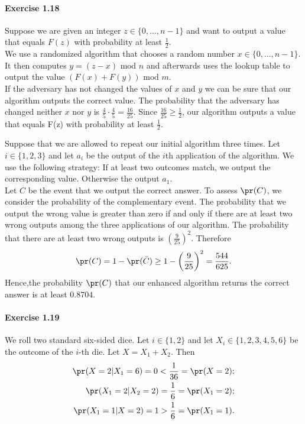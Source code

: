 \paragraph{Exercise 1.18} Suppose we are given an integer $z \in \{ 0, ..., n-1 \}$
and want to output a value that equals $F(z)$ with probability at least
$\frac{1}{2}$. \\
We use a randomized algorithm that chooses a random number $x \in \{ 0, ..., n-1 \}$.
It then computes $y = (z - x) \text{ mod }n$ and afterwards uses the lookup table
to output the value $(F(x) + F(y)) \text{ mod }m$. \\
If the adversary has not changed the values of $x$ and $y$ we can be sure that
our algorithm outputs the correct value. The probability that the adversary has
changed neither $x$ nor $y$ is $\frac{4}{5} \cdot \frac{4}{5} = \frac{16}{25}$.
Since $\frac{16}{25} \geq \frac{1}{2}$, our algorithm outputs a value that equals
F(z) with probability at least $\frac{1}{2}$.

Suppose that we are allowed to repeat our initial algorithm three times. Let $i
\in \{ 1, 2, 3 \}$ and let $a_i$ be the output of the $i$th application of the
algorithm. We use the following strategy: If at least two outcomes match, we output
the corresponding value. Otherwise the output $a_1$.  \\
 Let $C$ be the event that we output the correct answer. To assess $\pr(C)$, we
consider the probability of the complementary event. The probability that we
output the wrong value is greater than zero if and only if there are at least
two wrong outputs among the three applications of our algorithm. The probability
that there are at least two wrong outputs is $\left(\frac{9}{25}\right)^2$.
Therefore
\[ \pr(C) = 1 - \pr(\bar{C})\geq 1 - \left(\frac{9}{25}\right)^2 = \frac{544}{625}.\]
Hence,the probability $\pr(C)$ that our enhanced algorithm returns the correct
answer is at least $0.8704$.

\paragraph{Exercise 1.19} We roll two standard six-sided dice. Let $i \in \{ 1, 2 \}$
and let $X_i \in \{ 1, 2, 3, 4, 5, 6 \}$ be the outcome of the $i$-th die. Let
$X = X_1 + X_2$. Then
\begin{align*}
  \pr(X = 2 | X_1 = 6) = 0 < \frac{1}{36} = \pr(X = 2); \\
  \pr(X_1 = 2 | X_2 = 2) = \frac{1}{6} = \pr(X_1 = 2); \\
  \pr(X_1 = 1 | X = 2) = 1 > \frac{1}{6} = \pr(X_1 = 1).
\end{align*}

